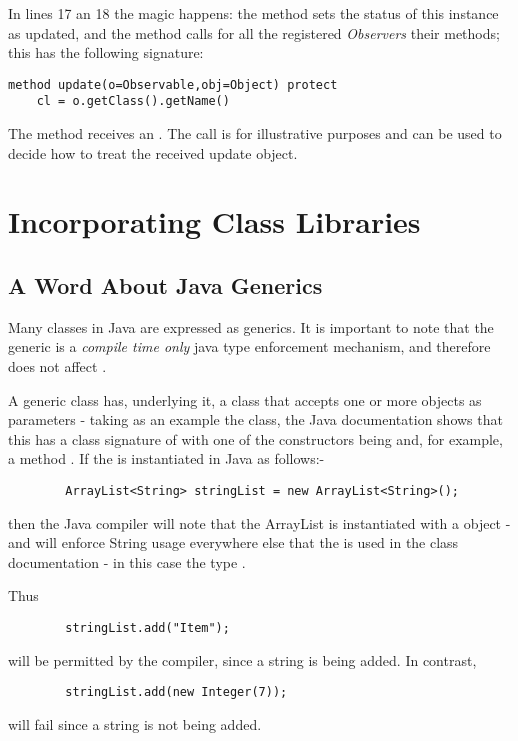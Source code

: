 {\begin{lstlisting}[label=obs3,caption=an Observable Thread]
\end{lstlisting}
In lines 17 an 18 the magic happens: the  method
sets the status of this instance as updated, and the
 method calls for all the registered
\emph{Observers} their  methods; this has the following
signature:

\begin{lstlisting}[label=obs4,caption=the update() method]
  method update(o=Observable,obj=Object) protect
    cl = o.getClass().getName()
\end{lstlisting}
The  method receives an . The
 call is for illustrative purposes and can be
used to decide how to treat the received update object.



\chapter{Incorporating Class Libraries}
\section{A Word About Java Generics}
Many classes in Java are expressed as generics. It is important to note that the generic is a \emph{compile time only} java type 
enforcement mechanism, and therefore does not affect \nr{}.

A generic class has, underlying it, a class that accepts one or more objects as parameters - taking as an example the  class, the Java documentation shows that this has a class signature of  with one of the constructors being  and, for example, a method .
 If the  is instantiated in Java as follows:-

\begin{verbatim}
		ArrayList<String> stringList = new ArrayList<String>();
\end{verbatim}

then the Java compiler will note that the ArrayList is instantiated with a  object - and will enforce String usage everywhere else that the  is used in the class documentation - in this case the type .

Thus 
\begin{verbatim}
		stringList.add("Item");
\end{verbatim}
will be permitted by the compiler, since a string is being added. In contrast, 
\begin{verbatim}
		stringList.add(new Integer(7));
\end{verbatim}
will fail since a string is not being added.

}
